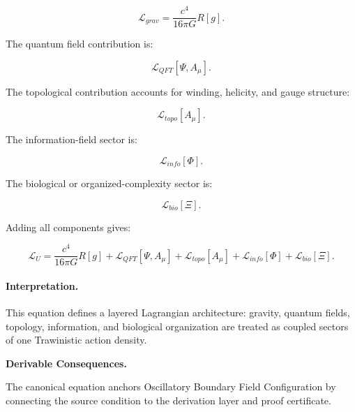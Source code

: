 \begin{equation}
\mathcal{L}_{grav}
=
\frac{c^4}{16\pi G}R[g].
\end{equation}

The quantum field contribution is:

\begin{equation}
\mathcal{L}_{QFT}[\Psi,A_\mu].
\end{equation}

The topological contribution accounts for winding, helicity, and gauge structure:

\begin{equation}
\mathcal{L}_{topo}[A_\mu].
\end{equation}

The information-field sector is:

\begin{equation}
\mathcal{L}_{info}[\Phi].
\end{equation}

The biological or organized-complexity sector is:

\begin{equation}
\mathcal{L}_{bio}[\Xi].
\end{equation}

Adding all components gives:

\begin{equation}
\boxed{
\mathcal{L}_U
=
\frac{c^4}{16\pi G}R[g]
+
\mathcal{L}_{QFT}[\Psi,A_\mu]
+
\mathcal{L}_{topo}[A_\mu]
+
\mathcal{L}_{info}[\Phi]
+
\mathcal{L}_{bio}[\Xi].
}
\end{equation}

\paragraph{Interpretation.}
This equation defines a layered Lagrangian architecture: gravity, quantum fields, topology, information, and biological organization are treated as coupled sectors of one Trawinistic action density.

\par\vspace{0.35em}
\noindent\textbf{Derivable Consequences.}\quad
\begingroup
\footnotesize
\raggedright
The canonical equation anchors Oscillatory Boundary Field Configuration by connecting the source condition to the derivation layer and proof certificate.
\par\endgroup


